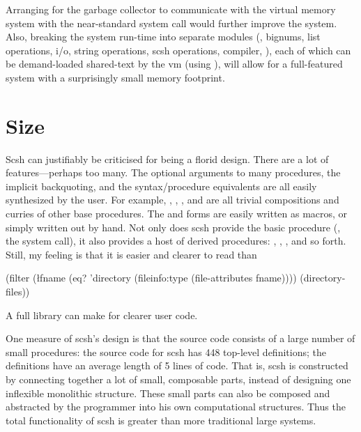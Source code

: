 Arranging for the garbage collector to communicate with the virtual memory
system with the near-standard  system call would further improve
the system. Also, breaking the system run-time into separate modules (\eg,
bignums, list operations, i/o, string operations, scsh operations, compiler,
\etc), each of which can be demand-loaded shared-text by the {\scm} vm
(using ), will allow for a full-featured system with a surprisingly
small memory footprint.

\section{Size}
\label{sec:size}
Scsh can justifiably be criticised for being a florid design.
There are a lot of features---perhaps too many.
The optional arguments to many procedures, the implicit backquoting, and
the syntax/procedure equivalents are all easily synthesized by the user.
For example, , , , 
and  are all trivial compositions and curries of other base
procedures.
The  and  forms are easily
written as macros, or simply written out by hand.
Not only does scsh provide the basic  procedure
(\ie, the  system call),
it also provides a host of derived procedures: , ,
, and so forth.
Still, my feeling is that it is easier and clearer to read
    than
\begin{code}
(filter (\l{fname}
          (eq? 'directory 
               (fileinfo:type (file-attributes fname))))
        (directory-files))\end{code}
A full library can make for clearer user code.

One measure of scsh's design is that the source code consists of
a large number of small procedures: the source code for scsh has 448
top-level definitions; the definitions have an average length of 5 lines of
code.
That is, scsh is constructed by connecting together a lot of
small, composable parts, instead of designing one inflexible monolithic
structure.
These small parts can also be composed and abstracted by the programmer
into his own computational structures.
Thus the total functionality of scsh is greater than more traditional
large systems.


